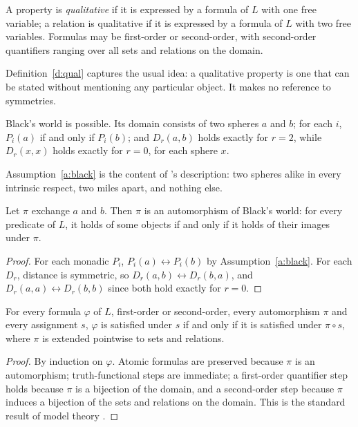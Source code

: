 \documentclass{situationist-preprint}
\begin{document}
\begin{definition}[Qualitative]\label{d:qual}
A property is \emph{qualitative} if it is expressed by a formula of $L$ with one free variable; a relation is qualitative if it is expressed by a formula of $L$ with two free variables. Formulas may be first-order or second-order, with second-order quantifiers ranging over all sets and relations on the domain.
\end{definition}

Definition~\ref{d:qual} captures the usual idea: a qualitative property is one that can be stated without mentioning any particular object. It makes no reference to symmetries.

\begin{assumption}\label{a:black}
Black's world is possible. Its domain consists of two spheres $a$ and $b$; for each $i$, $P_i(a)$ if and only if $P_i(b)$; and $D_r(a,b)$ holds exactly for $r = 2$, while $D_r(x,x)$ holds exactly for $r = 0$, for each sphere $x$.
\end{assumption}

Assumption~\ref{a:black} is the content of \citet{Black1952}'s description: two spheres alike in every intrinsic respect, two miles apart, and nothing else.

\begin{lemma}\label{l:auto}
Let $\pi$ exchange $a$ and $b$. Then $\pi$ is an automorphism of Black's world: for every predicate of $L$, it holds of some objects if and only if it holds of their images under $\pi$.
\end{lemma}

\begin{proof}
For each monadic $P_i$, $P_i(a) \leftrightarrow P_i(b)$ by Assumption~\ref{a:black}. For each $D_r$, distance is symmetric, so $D_r(a,b) \leftrightarrow D_r(b,a)$, and $D_r(a,a) \leftrightarrow D_r(b,b)$ since both hold exactly for $r=0$.
\end{proof}

\begin{lemma}[Invariance]\label{l:inv}
For every formula $\varphi$ of $L$, first-order or second-order, every automorphism $\pi$ and every assignment $s$, $\varphi$ is satisfied under $s$ if and only if it is satisfied under $\pi \circ s$, where $\pi$ is extended pointwise to sets and relations.
\end{lemma}

\begin{proof}
By induction on $\varphi$. Atomic formulas are preserved because $\pi$ is an automorphism; truth-functional steps are immediate; a first-order quantifier step holds because $\pi$ is a bijection of the domain, and a second-order step because $\pi$ induces a bijection of the sets and relations on the domain. This is the standard result of model theory \citep{Hodges1997}.
\end{proof}
\end{document}
